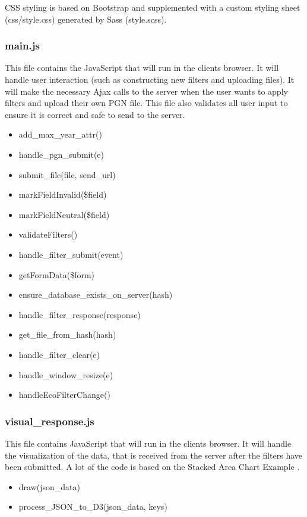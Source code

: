 \documentclass{article}
\begin{document}
CSS styling is based on Bootstrap and supplemented with a custom styling
sheet (css/style.css) generated by Sass (style.scss).

\subsubsection{main.js}
This file contains the JavaScript that will run in the clients browser. It
will handle user interaction (such as constructing new filters and uploading
files). It will make the necessary Ajax calls to the server when the user
wants to apply filters and upload their own PGN file. This file also
validates all user input to ensure it is correct and safe to send to the server.
\begin{itemize}
	\item add\_max\_year\_attr()
	\item handle\_pgn\_submit(e)
	\item submit\_file(file, send\_url)
	\item markFieldInvalid(\$field)
	\item markFieldNeutral(\$field)
	\item validateFilters()
	\item handle\_filter\_submit(event)
	\item getFormData(\$form)
	\item ensure\_database\_exists\_on\_server(hash)
	\item handle\_filter\_response(response)
	\item get\_file\_from\_hash(hash)
	\item handle\_filter\_clear(e)
	\item handle\_window\_resize(e)
	\item handleEcoFilterChange()
\end{itemize}

\subsubsection{visual\_response.js}
This file contains JavaScript that will run in the clients browser. It
will handle the visualization of the data, that is received from the server
after
the filters have been submitted. A lot of the code is based on the Stacked Area
Chart Example \cite{chart}.
\begin{itemize}
	\item draw(json\_data)
	\item process\_JSON\_to\_D3(json\_data, keys)
\end{itemize}
\end{document}
